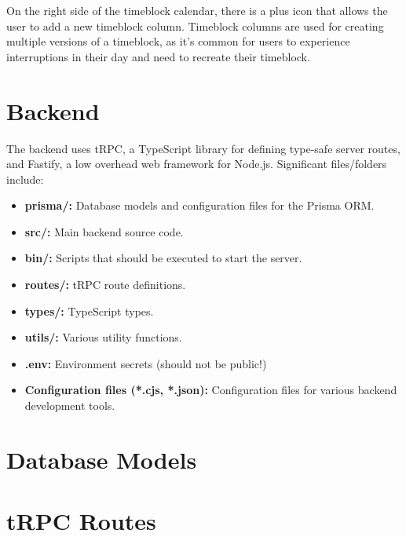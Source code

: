 \documentclass[notitlepage, 12pt]{report}
\begin{document}
On the right side of the timeblock calendar, there is a plus icon that allows the user to add a new timeblock column. Timeblock columns are used for creating multiple versions of a timeblock, as it’s common for users to experience interruptions in their day and need to recreate their timeblock.

\section*{Backend}
The backend uses tRPC, a TypeScript library for defining type-safe server routes, and Fastify, a low overhead web framework for Node.js. Significant files/folders include:

\begin{itemize}[label={}]
	\item	\textbf{prisma/:} Database models and configuration files for the Prisma ORM.
	\item	\textbf{src/:} Main backend source code.
	\item	\textbf{bin/:} Scripts that should be executed to start the server.
	\item	\textbf{routes/:} tRPC route definitions.
	\item	\textbf{types/:} TypeScript types.
	\item	\textbf{utils/:} Various utility functions.
	\item	\textbf{.env:} Environment secrets (should not be public!)
	\item	\textbf{Configuration files (*.cjs, *.json):} Configuration files for various backend development tools.
\end{itemize}

\section*{Database Models}

\section*{tRPC Routes}
\end{document}
